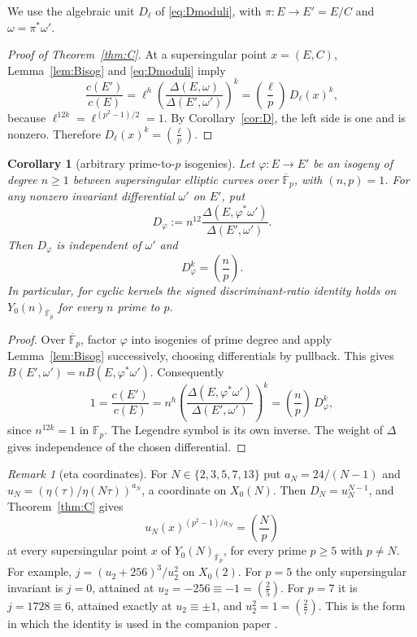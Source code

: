 \documentclass[11pt,a4paper]{article}
\numberwithin{equation}{section}
\newtheorem{corollary}[theorem]{Corollary}
\theoremstyle{definition}
\theoremstyle{remark}
\newtheorem{remark}[theorem]{Remark}
\newcommand{\Fp}{\mathbb F_p}
\newcommand{\Fb}{\overline{\mathbb F}_p}
\newcommand{\leg}[2]{\left(\frac{#1}{#2}\right)}
\newcommand{\Lp}[1]{\left(\frac{#1}{p}\right)}
\begin{document}
We use the algebraic unit $D_\ell$ of \eqref{eq:Dmoduli}, with
$\pi:E\to E'=E/C$ and $\omega=\pi^*\omega'$.

\begin{proof}[Proof of Theorem~\ref{thm:C}]
At a supersingular point $x=(E,C)$, Lemma~\ref{lem:Bisog} and
\eqref{eq:Dmoduli} imply
\[
\frac{c(E')}{c(E)}
=\ell^h\left(\frac{\Delta(E,\omega)}{\Delta(E',\omega')}\right)^k
=\Lp\ell\,D_\ell(x)^k,
\]
because $\ell^{12k}=\ell^{(p^2-1)/2}=1$.
By Corollary~\ref{cor:D}, the left side is one and is nonzero.
Therefore $D_\ell(x)^k=\Lp\ell$.
\end{proof}

\begin{corollary}[arbitrary prime-to-$p$ isogenies]\label{cor:degree-n}
Let $\varphi:E\to E'$ be an isogeny of degree $n\ge1$ between
supersingular elliptic curves over $\Fb$, with $(n,p)=1$. For any
nonzero invariant differential $\omega'$ on $E'$, put
\[
D_\varphi:=n^{12}
\frac{\Delta(E,\varphi^*\omega')}{\Delta(E',\omega')}.
\]
Then $D_\varphi$ is independent of $\omega'$ and
\[
D_\varphi^k=\Lp n.
\]
In particular, for cyclic kernels the signed discriminant-ratio
identity holds on $Y_0(n)_{\Fb}$ for every $n$ prime to $p$.
\end{corollary}
\begin{proof}
Over $\Fb$, factor $\varphi$ into isogenies of prime degree and apply
Lemma~\ref{lem:Bisog} successively, choosing differentials by pullback.
This gives $B(E',\omega')=nB(E,\varphi^*\omega')$. Consequently
\[
1=\frac{c(E')}{c(E)}
=n^h\left(\frac{\Delta(E,\varphi^*\omega')}{\Delta(E',\omega')}\right)^k
=\Lp n\,D_\varphi^k,
\]
since $n^{12k}=1$ in $\Fp$. The Legendre symbol is its own inverse.
The weight of $\Delta$ gives independence of the chosen differential.
\end{proof}

\begin{remark}[eta coordinates]\label{rem:eta}
For $N\in\{2,3,5,7,13\}$ put $a_N=24/(N-1)$ and
$u_N=(\eta(\tau)/\eta(N\tau))^{a_N}$, a coordinate on $X_0(N)$. Then
$D_N=u_N^{N-1}$, and Theorem~\ref{thm:C} gives
\[
u_N(x)^{(p^2-1)/a_N}=\Lp N
\]
at every supersingular point $x$ of $Y_0(N)_{\Fb}$, for every prime
$p\ge5$ with $p\ne N$. For example, $j=(u_2+256)^3/u_2^2$ on $X_0(2)$.
For $p=5$ the only supersingular invariant is $j=0$, attained at
$u_2=-256\equiv-1=\leg25$. For $p=7$ it is $j=1728\equiv6$, attained
exactly at $u_2\equiv\pm1$, and $u_2^2=1=\leg27$. This is the form in
which the identity is used in the companion paper \citep{JordanFricke}.
\end{remark}
\end{document}
